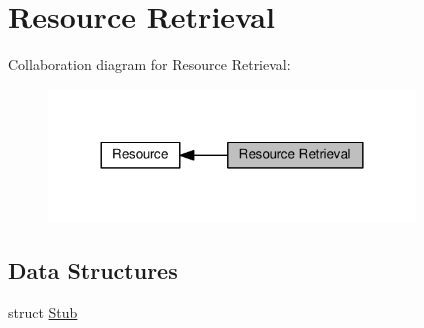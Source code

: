 \hypertarget{group__retrieval}{}\section{Resource Retrieval}
\label{group__retrieval}
Collaboration diagram for Resource Retrieval\+:
\nopagebreak
\begin{figure}[H]
\begin{center}
\leavevmode
\includegraphics[width=276pt]{group__retrieval}
\end{center}
\end{figure}
\subsection*{Data Structures}
\begin{DoxyCompactItemize}
\item 
struct \hyperlink{structStub}{Stub}
\end{DoxyCompactItemize}
